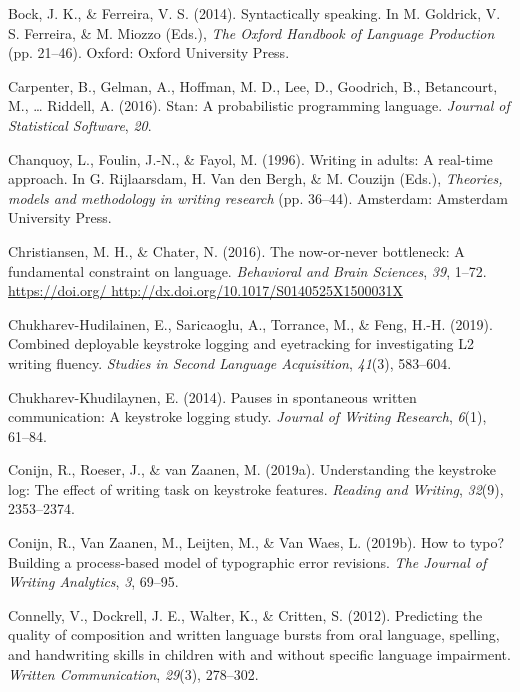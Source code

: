 \documentclass[english,man,floatsintext]{apa7}
\begin{document}
\leavevmode\hypertarget{ref-bock2014syntactically}{}%
Bock, J. K., \& Ferreira, V. S. (2014). Syntactically speaking. In M. Goldrick, V. S. Ferreira, \& M. Miozzo (Eds.), \emph{The Oxford Handbook of Language Production} (pp. 21--46). Oxford: Oxford University Press.

\leavevmode\hypertarget{ref-carpenter2016stan}{}%
Carpenter, B., Gelman, A., Hoffman, M. D., Lee, D., Goodrich, B., Betancourt, M., \ldots{} Riddell, A. (2016). Stan: A probabilistic programming language. \emph{Journal of Statistical Software}, \emph{20}.

\leavevmode\hypertarget{ref-chanquoy1996writing}{}%
Chanquoy, L., Foulin, J.-N., \& Fayol, M. (1996). Writing in adults: A real-time approach. In G. Rijlaarsdam, H. Van den Bergh, \& M. Couzijn (Eds.), \emph{Theories, models and methodology in writing research} (pp. 36--44). Amsterdam: Amsterdam University Press.

\leavevmode\hypertarget{ref-christiansen2016now}{}%
Christiansen, M. H., \& Chater, N. (2016). The now-or-never bottleneck: A fundamental constraint on language. \emph{Behavioral and Brain Sciences}, \emph{39}, 1--72. \href{https://doi.org/\%20http://dx.doi.org/10.1017/S0140525X1500031X}{https://doi.org/ http://dx.doi.org/10.1017/S0140525X1500031X}

\leavevmode\hypertarget{ref-chukharev2019combined}{}%
Chukharev-Hudilainen, E., Saricaoglu, A., Torrance, M., \& Feng, H.-H. (2019). Combined deployable keystroke logging and eyetracking for investigating L2 writing fluency. \emph{Studies in Second Language Acquisition}, \emph{41}(3), 583--604.

\leavevmode\hypertarget{ref-chukharev2014pauses}{}%
Chukharev-Khudilaynen, E. (2014). Pauses in spontaneous written communication: A keystroke logging study. \emph{Journal of Writing Research}, \emph{6}(1), 61--84.

\leavevmode\hypertarget{ref-conijn2019understanding}{}%
Conijn, R., Roeser, J., \& van Zaanen, M. (2019a). Understanding the keystroke log: The effect of writing task on keystroke features. \emph{Reading and Writing}, \emph{32}(9), 2353--2374.

\leavevmode\hypertarget{ref-conijn2019typo}{}%
Conijn, R., Van Zaanen, M., Leijten, M., \& Van Waes, L. (2019b). How to typo? Building a process-based model of typographic error revisions. \emph{The Journal of Writing Analytics}, \emph{3}, 69--95.

\leavevmode\hypertarget{ref-connelly2012predicting}{}%
Connelly, V., Dockrell, J. E., Walter, K., \& Critten, S. (2012). Predicting the quality of composition and written language bursts from oral language, spelling, and handwriting skills in children with and without specific language impairment. \emph{Written Communication}, \emph{29}(3), 278--302.
\end{document}

